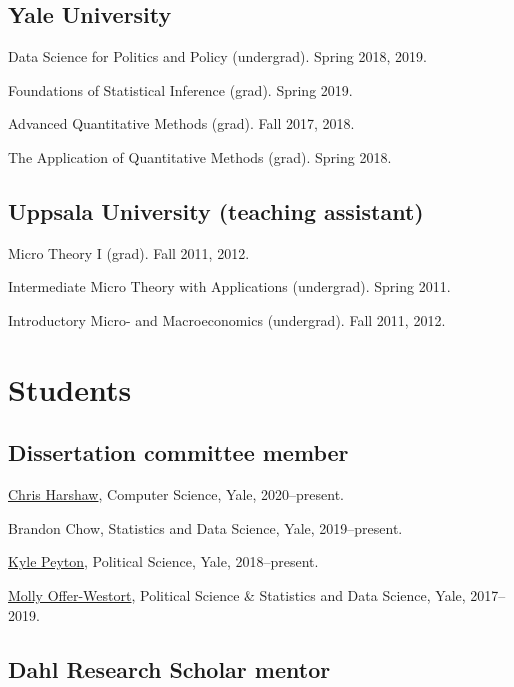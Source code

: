 \documentclass[10pt,letterpaper]{article}
\newenvironment{infolist}{
	\begin{list}{}{
		\setlength{\parskip}{0pt}
		\setlength{\itemsep}{4pt}
		\setlength{\parsep}{0.3em}
		\setlength{\leftmargin}{0em}
		\setlength{\labelwidth}{0em}
		}
	}{
\end{list}
}
\newcommand{\infoitem}[1]{\item {#1}}
\begin{document}
	\subsection*{Yale University}

	\begin{infolist}
		\infoitem{Data Science for Politics and Policy (undergrad). Spring 2018, 2019.}
		\infoitem{Foundations of Statistical Inference (grad). Spring 2019.}
		\infoitem{Advanced Quantitative Methods (grad). Fall 2017, 2018.}
		\infoitem{The Application of Quantitative Methods (grad). Spring 2018.}
	\end{infolist}

	\subsection*{Uppsala University (teaching assistant)}

	\begin{infolist}
		\infoitem{Micro Theory I (grad). Fall 2011, 2012.}
		\infoitem{Intermediate Micro Theory with Applications (undergrad). Spring 2011.}
		\infoitem{Introductory Micro- and Macroeconomics (undergrad). Fall 2011, 2012.}
	\end{infolist}


	\section*{Students}

	\subsection*{Dissertation committee member}

	\begin{infolist}
		\infoitem{\href{http://www.chrisharshaw.com/?page_id=4}{Chris Harshaw}, Computer Science, Yale, 2020--present.}
		\infoitem{Brandon Chow, Statistics and Data Science, Yale, 2019--present.}
		\infoitem{\href{https://kylepeyton.github.io}{Kyle Peyton}, Political Science, Yale, 2018--present.}
		\infoitem{\href{https://mollyow.github.io}{Molly Offer-Westort}, Political Science \& Statistics and Data Science, Yale, 2017--2019.}
	\end{infolist}

	\subsection*{Dahl Research Scholar mentor}
\end{document}
